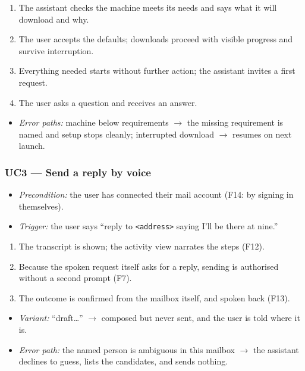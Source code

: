 \documentclass[12pt]{article}
\begin{document}
\begin{enumerate}[itemsep=1pt]
  \item The assistant checks the machine meets its needs and says what it
    will download and why.
  \item The user accepts the defaults; downloads proceed with visible
    progress and survive interruption.
  \item Everything needed starts without further action; the assistant
    invites a first request.
  \item The user asks a question and receives an answer.
\end{enumerate}

\begin{itemize}[itemsep=1pt]
  \item \emph{Error paths:} machine below requirements $\rightarrow$ the
    missing requirement is named and setup stops cleanly; interrupted
    download $\rightarrow$ resumes on next launch.
\end{itemize}

\subsubsection{UC3 --- Send a reply by voice}\label{sec:uc3}

\begin{itemize}[itemsep=1pt]
  \item \emph{Precondition:} the user has connected their mail account (F14:
    by signing in themselves).
  \item \emph{Trigger:} the user says ``reply to \texttt{<address>} saying
    I'll be there at nine.''
\end{itemize}

\begin{enumerate}[itemsep=1pt]
  \item The transcript is shown; the activity view narrates the steps (F12).
  \item Because the spoken request itself asks for a reply, sending is
    authorised without a second prompt (F7).
  \item The outcome is confirmed from the mailbox itself, and spoken back
    (F13).
\end{enumerate}

\begin{itemize}[itemsep=1pt]
  \item \emph{Variant:} ``draft\ldots'' $\rightarrow$ composed but never
    sent, and the user is told where it is.
  \item \emph{Error path:} the named person is ambiguous in this mailbox
    $\rightarrow$ the assistant declines to guess, lists the candidates, and
    sends nothing.
\end{itemize}
\end{document}
